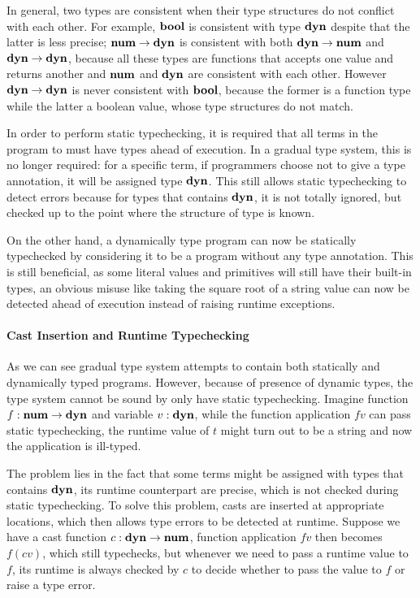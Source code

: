 

In general, two types are consistent when
their type structures do not conflict with each other.
For example, $\textbf{bool}$ is consistent with type $\textbf{dyn}$
despite that the latter is less precise;
$\textbf{num} \rightarrow \textbf{dyn}$ is consistent with both $\textbf{dyn} \rightarrow \textbf{num}$ and $\textbf{dyn} \rightarrow \textbf{dyn}$,
because all these types are functions that accepts one value and returns another and
$\textbf{num}$ and $\textbf{dyn}$ are consistent with each other.
However $\textbf{dyn} \rightarrow \textbf{dyn}$ is never consistent with $\textbf{bool}$,
because the former is a function type while the latter a boolean value,
whose type structures do not match.

In order to perform static typechecking, it is required that
all terms in the program to must have types ahead of execution.
In a gradual type system, this is no longer required:
for a specific term,
if programmers choose not to give a type annotation, it will be assigned type $\textbf{dyn}$.
This still allows static typechecking to detect errors because
for types that contains $\textbf{dyn}$, it is not totally ignored, but checked
up to the point where the structure of type is known.

On the other hand, a dynamically type program can now be statically typechecked
by considering it to be a program without any type annotation.
This is still beneficial, as some literal values and primitives will still have their built-in types,
an obvious misuse like taking the square root of a string value can now be detected ahead of execution
instead of raising runtime exceptions.

\paragraph{Cast Insertion and Runtime Typechecking}

As we can see gradual type system attempts to contain both statically and dynamically typed programs.
However, because of presence of dynamic types,
the type system cannot be sound by only have static typechecking.
Imagine function $f : \textbf{num} \rightarrow \textbf{dyn}$ and variable $v : \textbf{dyn}$, while the function application
$f v$ can pass static typechecking, the runtime value of $t$ might turn out to be a string
and now the application is ill-typed.

The problem lies in the fact that some terms might be assigned with types that contains
$\textbf{dyn}$, its runtime counterpart are precise, which is not checked during static typechecking.
To solve this problem, casts are inserted at appropriate locations, which then
allows type errors to be detected at runtime.
Suppose we have a cast function $c : \textbf{dyn} \rightarrow \textbf{num}$, function application $f v$
then becomes $f (c v)$, which still typechecks, but whenever we need to pass a runtime value to $f$,
its runtime is always checked by $c$ to decide whether to pass the value to $f$ or raise
a type error.

